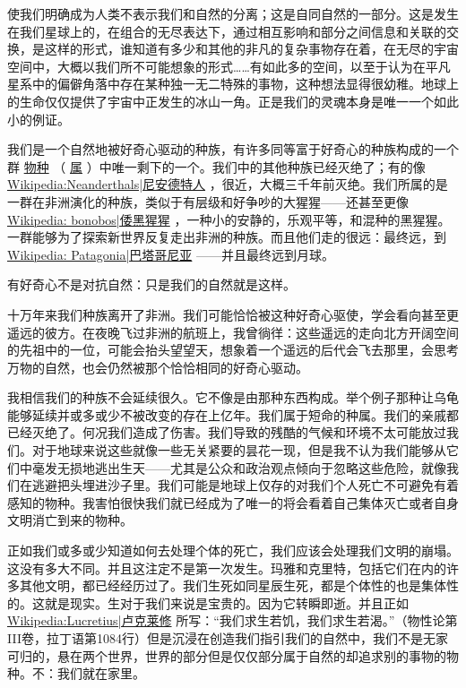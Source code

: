     使我们明确成为人类不表示我们和自然的分离；这是自同自然的一部分。这是发生在我们星球上的，在组合的无尽表达下，通过相互影响和部分之间信息和关联的交换，是这样的形式，谁知道有多少和其他的非凡的复杂事物存在着，在无尽的宇宙空间中，大概以我们所不可能想象的形式……有如此多的空间，以至于认为在平凡星系中的偏僻角落中存在某种独一无二特殊的事物，这种想法显得很幼稚。地球上的生命仅仅提供了宇宙中正发生的冰山一角。正是我们的灵魂本身是唯一一个如此小的例证。

    我们是一个自然地被好奇心驱动的种族，有许多同等富于好奇心的种族构成的一个群
\href{http://toyhouse.cc/wiki/index.php/物种}{物种}
（
\href{http://toyhouse.cc/wiki/index.php/属}{属}
）中唯一剩下的一个。我们中的其他种族已经灭绝了；有的像
\href{http://toyhouse.cc/wiki/index.php/Wikipedia:Neanderthals|尼安德特人}{Wikipedia:Neanderthals|尼安德特人}
，很近，大概三千年前灭绝。我们所属的是一群在非洲演化的种族，类似于有层级和好争吵的大猩猩——还甚至更像
\href{http://toyhouse.cc/wiki/index.php/Wikipedia: bonobos|倭黑猩猩}{Wikipedia: bonobos|倭黑猩猩}
，一种小的安静的，乐观平等，和混种的黑猩猩。一群能够为了探索新世界反复走出非洲的种族。而且他们走的很远：最终远，到
\href{http://toyhouse.cc/wiki/index.php/Wikipedia: Patagonia|巴塔哥尼亚}{Wikipedia: Patagonia|巴塔哥尼亚}
——并且最终远到月球。

    有好奇心不是对抗自然：只是我们的自然就是这样。
 
   十万年来我们种族离开了非洲。我们可能恰恰被这种好奇心驱使，学会看向甚至更遥远的彼方。在夜晚飞过非洲的航班上，我曾徜徉：这些遥远的走向北方开阔空间的先祖中的一位，可能会抬头望望天，想象着一个遥远的后代会飞去那里，会思考万物的自然，也会仍然被那个恰恰相同的好奇心驱动。

    我相信我们的种族不会延续很久。它不像是由那种东西构成。举个例子那种让乌龟能够延续并或多或少不被改变的存在上亿年。我们属于短命的种属。我们的亲戚都已经灭绝了。何况我们造成了伤害。我们导致的残酷的气候和环境不太可能放过我们。对于地球来说这些就像一些无关紧要的昙花一现，但是我不认为我们能够从它们中毫发无损地逃出生天——尤其是公众和政治观点倾向于忽略这些危险，就像我们在逃避把头埋进沙子里。我们可能是地球上仅存的对我们个人死亡不可避免有着感知的物种。我害怕很快我们就已经成为了唯一的将会看着自己集体灭亡或者自身文明消亡到来的物种。

    正如我们或多或少知道如何去处理个体的死亡，我们应该会处理我们文明的崩塌。这没有多大不同。并且这注定不是第一次发生。玛雅和克里特，包括它们在内的许多其他文明，都已经经历过了。我们生死如同星辰生死，都是个体性的也是集体性的。这就是现实。生对于我们来说是宝贵的。因为它转瞬即逝。并且正如
\href{http://toyhouse.cc/wiki/index.php/Wikipedia:Lucretius|卢克莱修}{Wikipedia:Lucretius|卢克莱修}
所写：“我们求生若饥，我们求生若渴。”（物性论第III卷，拉丁语第1084行）但是沉浸在创造我们指引我们的自然中，我们不是无家可归的，悬在两个世界，世界的部分但是仅仅部分属于自然的却追求别的事物的物种。不：我们就在家里。

